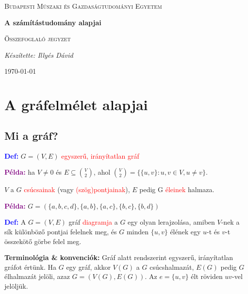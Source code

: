 \documentclass[12pt]{article}
\begin{document}
\begin{titlepage}
	\centering \vfill
	{\textsc{Budapesti Műszaki és Gazdaságtudományi Egyetem} \par} \vspace{7cm}
	{\huge\bfseries A számítástudomány alapjai\par} \vspace{0.5cm}
	{\large \textsc{Összefoglaló jegyzet}\par} \vspace{1.5cm}
	{\Large\itshape Készítette: Illyés Dávid\par} \vfill

	\noindent{}
	
	\vfill {\large \today\par}
\end{titlepage} 
\tableofcontents
{}

	\section{A gráfelmélet alapjai}
		\subsection{Mi a gráf?}
			
			\textcolor{blue}{\textbf{Def:}} $G = (V,E)$ \textcolor{red}{egyszerű, irányítatlan gráf}
			
			\textcolor{purple}{\textbf{Példa:}} ha $ V \neq 0$ és $E \subseteq \binom{V}{2}$, ahol $\binom{V}{2} = \{\{u,v\} : u,v \in V, u \neq v\}$.
			
			$V$ a $G$ \textcolor{red}{csúcsainak} (vagy \textcolor{red}{(szög)pontjainak}), $E$ pedig G \textcolor{red}{éleinek} halmaza. 
			
			\textcolor{purple}{\textbf{Példa:}} $G = (\{a,b,c,d\},\{a,b\},\{a,c\},\{b,c\},\{b,d\})$
			
			\textcolor{blue}{\textbf{Def:}} A $G = (V,E)$ gráf \textcolor{red}{diagramja} a $G$ egy olyan lerajzolása, amiben $V$-nek a sík különböző pontjai felelnek meg, és $G$ minden $\{u,v\}$ élének egy $u$-t és $v$-t összekötő görbe felel meg.
			
			\textbf{Terminológia \& konvenciók:} Gráf alatt rendszerint egyszerű, irányítatlan gráfot értünk. Ha $G$ egy gráf, akkor $V(G)$ a $G$ csúcshalmazát, $E(G)$ pedig $G$ élhalmazát jelöli, azaz $G = (V(G),E(G))$. Az $e = \{u,v\}$ élt röviden $uv$-vel jelöljük. 
			
\end{document}
